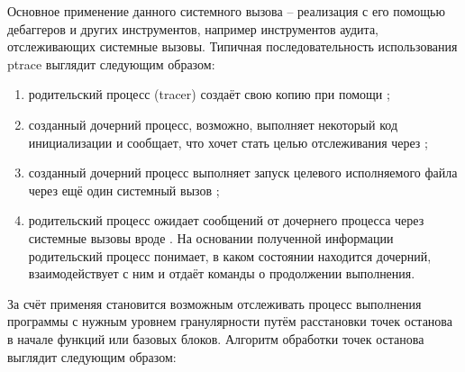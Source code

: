 Основное применение данного системного вызова -- реализация с его помощью дебаггеров и других инструментов, например инструментов аудита, отслеживающих системные вызовы. Типичная последовательность использования ptrace выглядит следующим образом:

\begin{enumerate}
	\item родительский процесс (tracer) создаёт свою копию при помощи ;
	
	\item созданный дочерний процесс, возможно, выполняет некоторый код инициализации и сообщает, что хочет стать целью отслеживания через ;
	
	\item созданный дочерний процесс выполняет запуск целевого исполняемого файла через ещё один системный вызов ;
	
	\item родительский процесс ожидает сообщений от дочернего процесса через системные вызовы вроде . На основании полученной информации родительский процесс понимает, в каком состоянии находится дочерний, взаимодействует с ним и отдаёт команды о продолжении выполнения.
\end{enumerate}

За счёт применяя  становится возможным отслеживать процесс выполнения программы с нужным уровнем гранулярности путём расстановки точек останова в начале функций или базовых блоков. Алгоритм обработки точек останова выглядит следующим образом:

